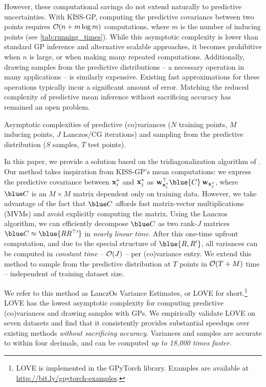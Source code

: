 However, these computational savings do not extend naturally to predictive uncertainties.
With KISS-GP, computing the predictive covariance between two points requires $\bigo{n + m \log m}$ computations, where $m$ is the number of inducing points (see \cref{tab:running_times}).
While this asymptotic complexity is lower than standard GP inference and alternative scalable approaches, it becomes prohibitive when $n$ is large, or when making many repeated computations.
Additionally, drawing samples from the predictive distributions -- a necessary operation in many applications -- is similarly expensive.
Existing fast approximations for these operations \cite{papandreou2011efficient,wilson2015thoughts,wang2017max} typically incur a significant amount of error.
Matching the reduced complexity of predictive mean inference without sacrificing accuracy has remained an open problem.

\begin{table}[t!]
  \caption{
    Asymptotic complexities of predictive (co)variances ($N$ training points, $M$ inducing points, $J$ Lanczos/CG iterations)
    and sampling from the predictive distribution ($S$ samples, $T$ test points).
    \label{tab:running_times}
  }
  \vspace{0.5ex}
  \centering
  \resizebox{\textwidth}{!}{%
    
  }
  \vspace{-2ex}
\end{table}


In this paper, we provide a solution based on the tridiagonalization algorithm of \citet{lanczos1950iteration}.
Our method takes inspiration from KISS-GP's mean computations: we express the predictive covariance between $\mathbf{x}^*_i$ and $\mathbf{x}^{*}_j$ as
$\bw_{\bxtest_i}^\top \blue{\bC} \: \bw_{\bxtest_j}$,
where $\blue C$ is an $M \times M$ matrix dependent only on training data.
However, we take advantage of the fact that $\blue \bC$ affords fast matrix-vector multiplications (MVMs) and avoid explicitly computing the matrix.
Using the Lanczos algorithm, we can efficiently decompose $\blue \bC$ as two rank-$J$ matrices $\blue \bC \approx \blue{\bR \bR^{\top \prime}}$ in \emph{nearly linear time}.
After this one-time upfront computation, and due to the special structure of $\blue {\bR,\bR^\prime}$, all variances can be computed in \emph{constant time} -- $\bigo{J}$ -- per (co)variance entry.
We extend this method to sample from the predictive distribution at $T$ points in $\bigo{T + M}$ time -- independent of training dataset size.

We refer to this method as LanczOs Variance Estimates, or LOVE{} for short.\footnote{
  LOVE{} is implemented in the GPyTorch library.
  Examples are available at \url{http://bit.ly/gpytorch-examples}.
}
LOVE{} has the lowest asymptotic complexity for computing predictive (co)variances and drawing samples with GPs.
We empirically validate LOVE{} on seven datasets and find that it consistently provides substantial speedups over existing methods \emph{without sacrificing accuracy}.
Variances and samples are accurate to within four decimals, and can be computed \emph{up to 18,000 times faster.}

